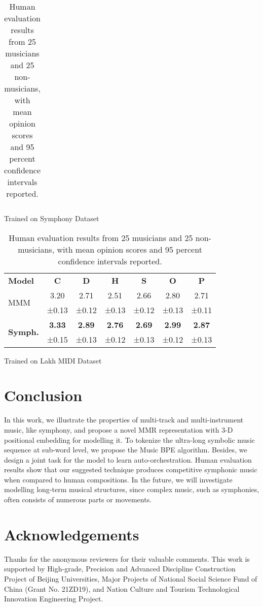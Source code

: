 \documentclass{article}
\begin{document}
\begin{table}
\begin{subtable}{\linewidth}
\begin{tabular}{llcccccc}
\end{tabular}
\caption{Trained on Symphony Dataset}
\label{tab:human listen_A}
\end{subtable}
\hfill
\hfill
\begin{subtable}{\linewidth}

\setlength{\tabcolsep}{5.6 pt}
\renewcommand{\arraystretch}{1.25}
\begin{tabular}{lcccccc}
 &  &  &  &  &  & \\
\hline
\textbf{Model} & \textbf{C} & \textbf{D} & \textbf{H} & \textbf{S} & \textbf{O} & \textbf{P} \\ \hline
\multirow{2}{*}{MMM} & 3.20 & 2.71 & 2.51 & 2.66 & 2.80 & 2.71 \\
 & ±0.13 & ±0.12 & ±0.13 & ±0.12 & ±0.13 & ±0.11 \\ \hline
\multirow{2}{*}{\textbf{Symph.}} & \textbf{3.33} & \textbf{2.89} & \textbf{2.76} & \textbf{2.69} & \textbf{2.99} & \textbf{2.87} \\
 & ±0.15 & ±0.13 & ±0.12 & ±0.13 & ±0.12 & ±0.13 \\ \hline
\end{tabular} \caption{Trained on Lakh MIDI Dataset} \label{tab:human listen_B}
\end{subtable}
 \caption{Human evaluation results from 25 musicians and 25 non-musicians, with mean opinion scores and 95 percent confidence intervals reported.}
 \label{tab:human listen}\end{table}


\section{Conclusion}
In this work, we illustrate the properties of multi-track and multi-instrument music, like symphony, and propose a novel MMR representation with 3-D positional embedding for modelling it. To tokenize the ultra-long symbolic music sequence at sub-word level, we propose the Music BPE algorithm. Besides, we design a joint task for the model to learn auto-orchestration. Human evaluation results show that our suggested technique produces competitive symphonic music when compared to human compositions. In the future, we will investigate modelling long-term musical structures, since complex music, such as symphonies, often consists of numerous parts or movements.
\section{Acknowledgements}
Thanks for the anonymous reviewers for their valuable comments. This work is supported by High-grade, Precision and Advanced Discipline Construction Project of Beijing Universities, Major Projects of National Social Science Fund of China (Grant No. 21ZD19), and Nation Culture and Tourism Technological Innovation Engineering Project.

\end{document}
